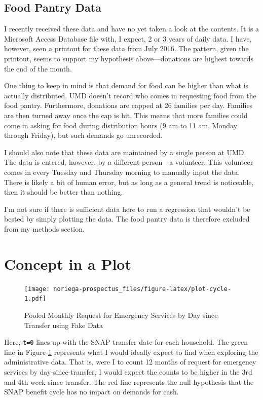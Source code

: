 \documentclass[12pt,letterpaperpaper,]{book}
\begin{document}
\subsection*{Food Pantry Data}\label{food-pantry-data}

I recently received these data and have no yet taken a look at the
contents. It is a Microsoft Access Database file with, I expect, 2 or 3
years of daily data. I have, however, seen a printout for these data
from July 2016. The pattern, given the printout, seems to support my
hypothesis above---donations are highest towards the end of the month.

One thing to keep in mind is that demand for food can be higher than
what is actually distributed. UMD doesn't record who comes in requesting
food from the food pantry. Furthermore, donations are capped at 26
families per day. Families are then turned away once the cap is hit.
This means that more families could come in asking for food during
distribution hours (9 am to 11 am, Monday through Friday), but such
demands go unrecorded.

I should also note that these data are maintained by a single person at
UMD. The data is entered, however, by a different person---a volunteer.
This volunteer comes in every Tuesday and Thursday morning to manually
input the data. There is likely a bit of human error, but as long as a
general trend is noticeable, then it should be better than nothing.

I'm not sure if there is sufficient data here to run a regression that
wouldn't be bested by simply plotting the data. The food pantry data is
therefore excluded from my methods section.

\newpage

\section*{Concept in a Plot}\label{concept-in-a-plot-2}

\begin{figure}
\centering
\texttt{[image: noriega-prospectus\_files/figure-latex/plot-cycle-1.pdf]}
\caption{\label{fig:plot-cycle}Pooled Monthly Request for Emergency Services
by Day since Transfer using Fake Data}
\end{figure}

Here, \texttt{t=0} lines up with the SNAP transfer date for each
household. The green line in Figure \ref{fig:plot-cycle} represents what
I would ideally expect to find when exploring the administrative data.
That is, were I to count 12 months of request for emergency services by
day-since-transfer, I would expect the counts to be higher in the 3rd
and 4th week since transfer. The red line represents the null hypothesis
that the SNAP benefit cycle has no impact on demands for cash.
\end{document}
